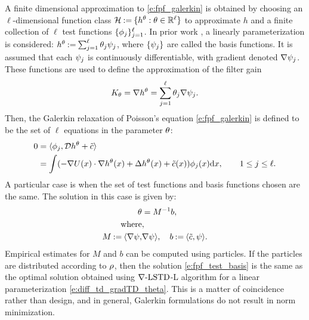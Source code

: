 A finite dimensional approximation to \eqref{e:fpf_galerkin} is obtained by choosing an $\ell$-dimensional  function class
${\cal H}  \mathbin{:=} \{h^\theta : \theta \in \mathbb{R}^\ell\}$ to approximate $h$ and a finite collection of $\ell$ test functions $\{\phi_j\}_{j=1}^{\ell}$. In prior work \cite{yanmehmey13,yanlaumehmey16}, a linearly parameterization is considered: $h^\theta \mathbin{:=} \sum_{j=1}^{\ell}\theta_{j}\psi_{j} $, where $\{\psi_j\}$ are called the basis functions.  It is assumed that each $\psi_j$ is continuously differentiable,  with gradient denoted   $\nabla \psi_{j} $.
 These   functions are used to define the approximation of the filter gain
\begin{equation}
K_\param = \nabla h^\param= \sum_{j=1}^{\ell}\param_{j}\gradbasis_{j}.
\label{e:fpf_basis_galerkin}
\end{equation}
Then, the Galerkin relaxation of Poisson's equation \eqref{e:fpf_galerkin} is defined to be the set of $\ell$ equations in the parameter $\theta$:
\begin{equation}
\begin{aligned}
0 &= \langle \test_{j}, \clD h^\param+\tilc \rangle \\
&= \int (-\nabla U(x) \cdot \nabla h^\param(x)+ \Delta h^\param(x)+\tilc (x))\test_{j}(x) \ud x,  \qquad  1\leq j \leq \ell.
\end{aligned}
\label{e:fpf_galerkin_be}
\end{equation}
A particular case is when the set of test functions and basis functions chosen are the same. The solution in this case is given by:
\begin{equation}
\begin{aligned}
\param & = M^{-1} b, \\
\text{where}&,\\ 
M \eqdef \langle \gradbasis, &\gradbasis \rangle, \quad b \eqdef \langle \tilc, \basis \rangle.
\label{e:fpf_test_basis}
\end{aligned}
\end{equation}
Empirical estimates for $M$ and $b$ can be computed using particles. If the particles are distributed according to $\rho$, then the solution \eqref{e:fpf_test_basis} is the same as the optimal solution obtained using $\nabla\text{-LSTD}$-L algorithm for a linear parameterization \eqref{e:diff_td_gradTD_theta}. This is a matter of coincidence rather than design, and in general, Galerkin formulations do not result in norm minimization. 

